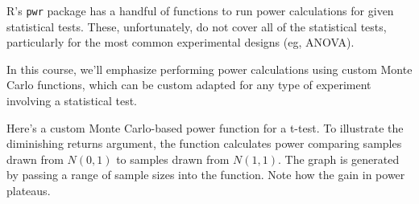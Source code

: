 \documentclass[]{book}
\begin{document}
R's \texttt{pwr} package has a handful of functions to run power calculations for given statistical tests. These, unfortunately, do not cover all of the statistical tests, particularly for the most common experimental designs (eg, ANOVA).

In this course, we'll emphasize performing power calculations using custom Monte Carlo functions, which can be custom adapted for any type of experiment involving a statistical test.

Here's a custom Monte Carlo-based power function for a t-test. To illustrate the diminishing returns argument, the function calculates power comparing samples drawn from \(N(0,1)\) to samples drawn from \(N(1,1)\). The graph is generated by passing a range of sample sizes into the function. Note how the gain in power plateaus.
\end{document}

